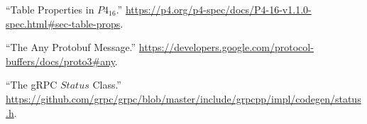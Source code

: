 \documentclass[11pt]{article}
\begin{document}
{{\begin{thebibliography}{36}
\mdbibitemlabel{{}[28]}\textquotedblleft{}Table Properties in $P4_{16}$.\textquotedblright{} \href{https://p4.org/p4-spec/docs/P4-16-v1.1.0-spec.html\%23sec-table-props}{{\ttfamily https://\hspace{0pt}p4.\hspace{0pt}org/\hspace{0pt}p4-\hspace{0pt}spec/\hspace{0pt}docs/\hspace{0pt}P4-\hspace{0pt}16-\hspace{0pt}v1.\hspace{0pt}1.\hspace{0pt}0-\hspace{0pt}spec.\hspace{0pt}html\#\hspace{0pt}sec-\hspace{0pt}table-\hspace{0pt}props}}.\label{p4tableproperties}%

\mdbibitemlabel{{}[29]}\textquotedblleft{}The Any Protobuf Message.\textquotedblright{} \href{https://developers.google.com/protocol-buffers/docs/proto3\%23any}{{\ttfamily https://\hspace{0pt}developers.\hspace{0pt}google.\hspace{0pt}com/\hspace{0pt}protocol-\hspace{0pt}buffers/\hspace{0pt}docs/\hspace{0pt}proto3\#\hspace{0pt}any}}.\label{protoany}%

\mdbibitemlabel{{}[30]}\textquotedblleft{}The gRPC $Status$ Class.\textquotedblright{} \href{https://github.com/grpc/grpc/blob/master/include/grpcpp/impl/codegen/status.h}{{\ttfamily https://\hspace{0pt}github.\hspace{0pt}com/\hspace{0pt}grpc/\hspace{0pt}grpc/\hspace{0pt}blob/\hspace{0pt}master/\hspace{0pt}include/\hspace{0pt}grpcpp/\hspace{0pt}impl/\hspace{0pt}codegen/\hspace{0pt}status.\hspace{0pt}h}}.\label{grpcstatus}%


\end{thebibliography}}}
\end{document}
